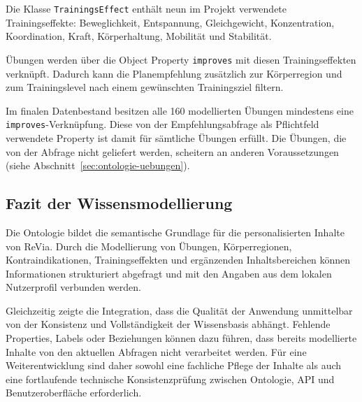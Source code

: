 Die Klasse \texttt{TrainingsEffect} enthält neun im Projekt verwendete Trainingseffekte: Beweglichkeit, Entspannung, Gleichgewicht, Konzentration, Koordination, Kraft, Körperhaltung, Mobilität und Stabilität.

Übungen werden über die Object Property \texttt{improves} mit diesen Trainingseffekten verknüpft. Dadurch kann die Planempfehlung zusätzlich zur Körperregion und zum Trainingslevel nach einem gewünschten Trainingsziel filtern.

Im finalen Datenbestand besitzen alle 160 modellierten Übungen mindestens eine \texttt{improves}-Verknüpfung. Diese von der Empfehlungsabfrage als Pflichtfeld verwendete Property ist damit für sämtliche Übungen erfüllt. Die Übungen, die von der Abfrage nicht geliefert werden, scheitern an anderen Voraussetzungen (siehe Abschnitt~\ref{sec:ontologie-uebungen}).

\subsection{Fazit der Wissensmodellierung}

Die Ontologie bildet die semantische Grundlage für die personalisierten Inhalte von ReVia. Durch die Modellierung von Übungen, Körperregionen, Kontraindikationen, Trainingseffekten und ergänzenden Inhaltsbereichen können Informationen strukturiert abgefragt und mit den Angaben aus dem lokalen Nutzerprofil verbunden werden.

Gleichzeitig zeigte die Integration, dass die Qualität der Anwendung unmittelbar von der Konsistenz und Vollständigkeit der Wissensbasis abhängt. Fehlende Properties, Labels oder Beziehungen können dazu führen, dass bereits modellierte Inhalte von den aktuellen Abfragen nicht verarbeitet werden. Für eine Weiterentwicklung sind daher sowohl eine fachliche Pflege der Inhalte als auch eine fortlaufende technische Konsistenzprüfung zwischen Ontologie, API und Benutzeroberfläche erforderlich.
